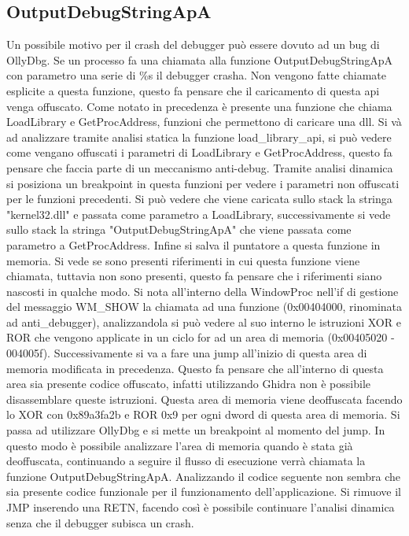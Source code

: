 \documentclass[a4paper,10pt]{article}
\begin{document}
\subsection{OutputDebugStringApA}
Un possibile motivo per il crash del debugger può essere dovuto ad un bug di OllyDbg. Se un processo fa una chiamata alla funzione OutputDebugStringApA con parametro una serie di \%s il debugger crasha. Non vengono fatte chiamate esplicite a questa funzione, questo fa pensare che il caricamento di questa api venga offuscato. Come notato in precedenza è presente una funzione che chiama LoadLibrary e GetProcAddress, funzioni che permettono di caricare una dll. Si và ad analizzare tramite analisi statica la funzione load\_library\_api, si può vedere come vengano offuscati i parametri di LoadLibrary e GetProcAddress, questo fa pensare che faccia parte di un meccanismo anti-debug. Tramite analisi dinamica si posiziona un breakpoint in questa funzioni per vedere i parametri non offuscati per le funzioni precedenti. Si può vedere che viene caricata  sullo stack la stringa "kernel32.dll" e passata come parametro a LoadLibrary, successivamente si vede sullo stack la stringa "OutputDebugStringApA" che viene passata come parametro a GetProcAddress. Infine si salva il puntatore a questa funzione in memoria. Si vede se sono presenti riferimenti in cui questa funzione viene chiamata, tuttavia non sono presenti, questo fa pensare che i riferimenti siano nascosti in qualche modo.  Si nota all'interno della WindowProc nell'if di gestione  del messaggio WM\_SHOW la chiamata ad una funzione (0x00404000, rinominata ad anti\_debugger), analizzandola si può vedere al suo interno le istruzioni XOR e ROR che vengono applicate in un ciclo for ad un area di memoria (0x00405020 - 004005f).
 Successivamente si va a fare una jump all'inizio di questa area di memoria modificata in precedenza. Questo fa pensare che all'interno di questa area sia presente codice offuscato, infatti utilizzando Ghidra non è possibile disassemblare queste istruzioni.  Questa area di memoria viene deoffuscata facendo lo XOR con 0x89a3fa2b e ROR 0x9 per ogni dword di questa area di memoria.
 Si passa ad utilizzare OllyDbg e si mette un breakpoint al momento del jump. In questo modo è possibile analizzare l'area di memoria quando è stata già deoffuscata, continuando a seguire il flusso di esecuzione verrà chiamata la funzione OutputDebugStringApA. Analizzando il codice seguente non sembra che sia presente codice funzionale per il funzionamento dell'applicazione. Si rimuove il JMP inserendo una RETN, facendo così è possibile continuare l'analisi dinamica senza che il debugger subisca un crash.
\end{document}
